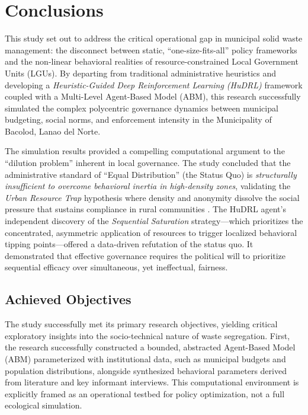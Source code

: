 
\chapter{Conclusions}

This study set out to address the critical operational gap in municipal solid waste management: the disconnect between static, ``one-size-fits-all'' policy frameworks and the non-linear behavioral realities of resource-constrained Local Government Units (LGUs). By departing from traditional administrative heuristics and developing a \textit{Heuristic-Guided Deep Reinforcement Learning (HuDRL)} framework coupled with a Multi-Level Agent-Based Model (ABM), this research successfully simulated the complex polycentric governance dynamics between municipal budgeting, social norms, and enforcement intensity in the Municipality of Bacolod, Lanao del Norte.

The simulation results provided a compelling computational argument to the ``dilution problem'' inherent in local governance. The study concluded that the administrative standard of ``Equal Distribution'' (the Status Quo) is \textit{structurally insufficient to overcome behavioral inertia in high-density zones}, validating the \textit{Urban Resource Trap} hypothesis where density and anonymity dissolve the social pressure that sustains compliance in rural communities \citep{Nishimura2022}. The HuDRL agent's independent discovery of the \textit{Sequential Saturation} strategy—which prioritizes the concentrated, asymmetric application of resources to trigger localized behavioral tipping points—offered a data-driven refutation of the status quo. It demonstrated that effective governance requires the political will to prioritize sequential efficacy over simultaneous, yet ineffectual, fairness.

\newpage

\section{Achieved Objectives}
\setlength{\parindent}{2em}

The study successfully met its primary research objectives, yielding critical exploratory insights into the socio-technical nature of waste segregation. First, the research successfully constructed a bounded, abstracted Agent-Based Model (ABM) parameterized with institutional data, such as municipal budgets and population distributions, alongside synthesized behavioral parameters derived from literature and key informant interviews. This computational environment is explicitly framed as an operational testbed for policy optimization, not a full ecological simulation. 


